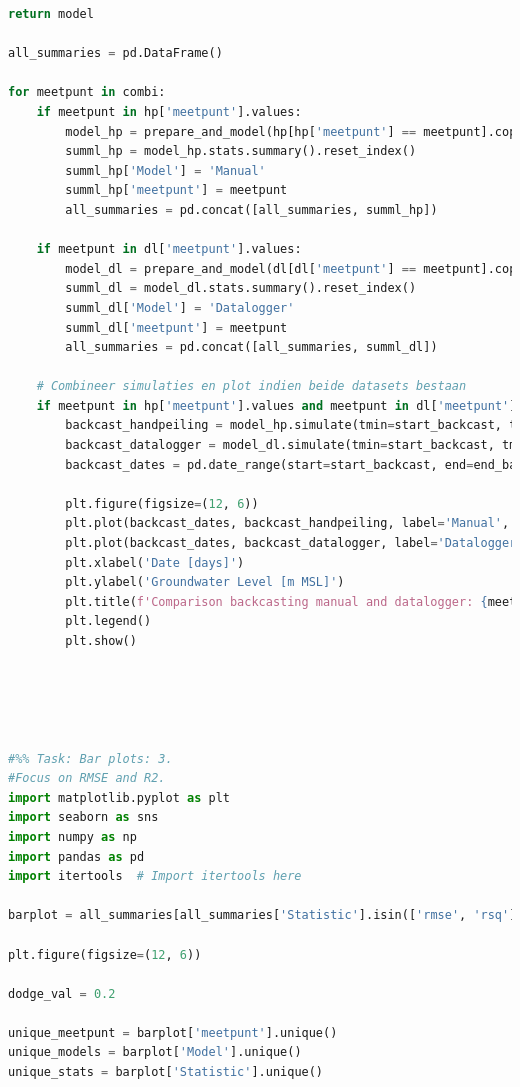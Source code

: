 \begin{lstlisting}[language=Python]
    return model

all_summaries = pd.DataFrame()

for meetpunt in combi:
    if meetpunt in hp['meetpunt'].values:
        model_hp = prepare_and_model(hp[hp['meetpunt'] == meetpunt].copy(), meetpunt, recharge, f'meting_ml7{meetpunt}')
        summl_hp = model_hp.stats.summary().reset_index()
        summl_hp['Model'] = 'Manual'
        summl_hp['meetpunt'] = meetpunt
        all_summaries = pd.concat([all_summaries, summl_hp])
    
    if meetpunt in dl['meetpunt'].values:
        model_dl = prepare_and_model(dl[dl['meetpunt'] == meetpunt].copy(), meetpunt, recharge, f'meting_ml9 {meetpunt}')
        summl_dl = model_dl.stats.summary().reset_index()
        summl_dl['Model'] = 'Datalogger'
        summl_dl['meetpunt'] = meetpunt
        all_summaries = pd.concat([all_summaries, summl_dl])
    
    # Combineer simulaties en plot indien beide datasets bestaan
    if meetpunt in hp['meetpunt'].values and meetpunt in dl['meetpunt'].values:
        backcast_handpeiling = model_hp.simulate(tmin=start_backcast, tmax=end_backcast)
        backcast_datalogger = model_dl.simulate(tmin=start_backcast, tmax=end_backcast)
        backcast_dates = pd.date_range(start=start_backcast, end=end_backcast, freq='D')
        
        plt.figure(figsize=(12, 6))
        plt.plot(backcast_dates, backcast_handpeiling, label='Manual', color='cyan')
        plt.plot(backcast_dates, backcast_datalogger, label='Datalogger', color='pink')
        plt.xlabel('Date [days]')
        plt.ylabel('Groundwater Level [m MSL]')
        plt.title(f'Comparison backcasting manual and datalogger: {meetpunt}')
        plt.legend()
        plt.show()




    
#%% Task: Bar plots: 3.
#Focus on RMSE and R2.
import matplotlib.pyplot as plt
import seaborn as sns
import numpy as np
import pandas as pd
import itertools  # Import itertools here

barplot = all_summaries[all_summaries['Statistic'].isin(['rmse', 'rsq'])]

plt.figure(figsize=(12, 6))

dodge_val = 0.2

unique_meetpunt = barplot['meetpunt'].unique()
unique_models = barplot['Model'].unique()
unique_stats = barplot['Statistic'].unique()


\end{lstlisting}
